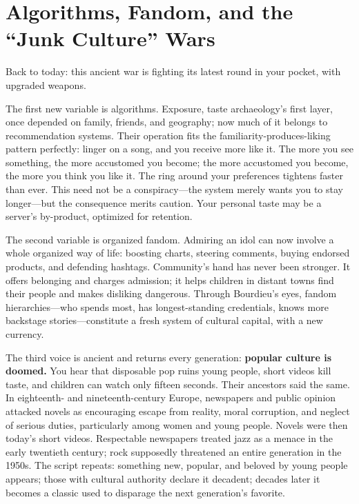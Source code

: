 \section[Algorithms, Fandom, and Culture Wars]{Algorithms, Fandom, and the ``Junk Culture'' Wars}
Back to today: this ancient war is fighting its latest round in your pocket, with upgraded weapons.

The first new variable is algorithms. Exposure, taste archaeology's first layer, once depended on family, friends, and geography; now much of it belongs to recommendation systems. Their operation fits the familiarity-produces-liking pattern perfectly: linger on a song, and you receive more like it. The more you see something, the more accustomed you become; the more accustomed you become, the more you think you like it. The ring around your preferences tightens faster than ever. This need not be a conspiracy---the system merely wants you to stay longer---but the consequence merits caution. Your personal taste may be a server's by-product, optimized for retention.

The second variable is organized fandom. Admiring an idol can now involve a whole organized way of life: boosting charts, steering comments, buying endorsed products, and defending hashtags. Community's hand has never been stronger. It offers belonging and charges admission; it helps children in distant towns find their people and makes disliking dangerous. Through Bourdieu's eyes, fandom hierarchies---who spends most, has longest-standing credentials, knows more backstage stories---constitute a fresh system of cultural capital, with a new currency.

The third voice is ancient and returns every generation: \textbf{popular culture is doomed.} You hear that disposable pop ruins young people, short videos kill taste, and children can watch only fifteen seconds. Their ancestors said the same. In eighteenth- and nineteenth-century Europe, newspapers and public opinion attacked novels as encouraging escape from reality, moral corruption, and neglect of serious duties, particularly among women and young people. Novels were then today's short videos. Respectable newspapers treated jazz as a menace in the early twentieth century; rock supposedly threatened an entire generation in the 1950s. The script repeats: something new, popular, and beloved by young people appears; those with cultural authority declare it decadent; decades later it becomes a classic used to disparage the next generation's favorite.

